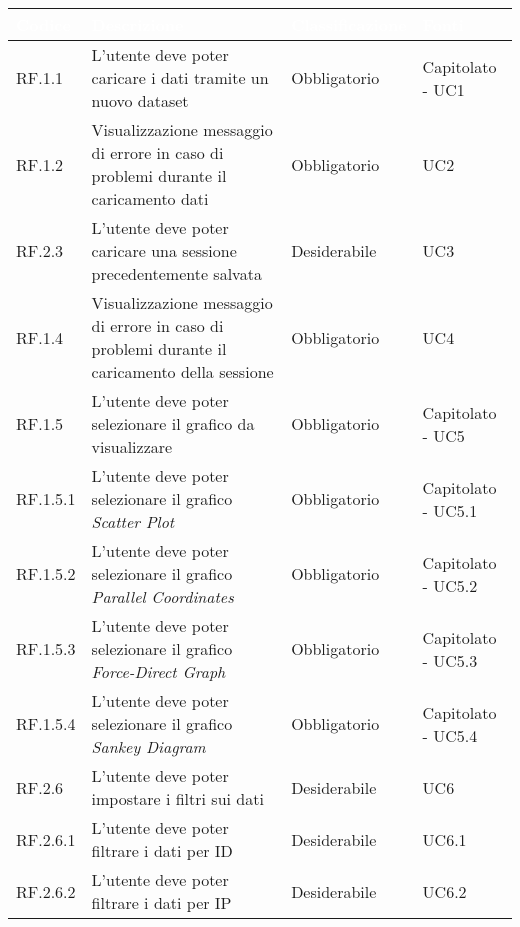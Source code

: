 \begin{center}
  \centering
  \begin{longtable}{|L{1,5cm}|C{5,5cm}|C{3cm}|C{2cm}|}
    \hline
    \textcolor[HTML]{FFFFFF}{\textbf{Codice}} & \textcolor[HTML]{FFFFFF}{\textbf{Descrizione}} & \textcolor[HTML]{FFFFFF}{\textbf{Classificazione}} & \textcolor[HTML]{FFFFFF}{\textbf{Fonti}}
    \\ \hline
    RF.1.1 & L'utente deve poter caricare i dati tramite un nuovo dataset & Obbligatorio & Capitolato - UC1 \\ \hline
    RF.1.2 & Visualizzazione messaggio di errore in caso di problemi durante il caricamento dati & Obbligatorio & UC2 \\ \hline
    RF.2.3 & L'utente deve poter caricare una sessione precedentemente salvata & Desiderabile & UC3 \\ \hline
    RF.1.4 & Visualizzazione messaggio di errore in caso di problemi durante il caricamento della sessione & Obbligatorio & UC4 \\ \hline
    RF.1.5 & L'utente deve poter selezionare il grafico da visualizzare & Obbligatorio & Capitolato - UC5 \\ \hline
    RF.1.5.1 & L'utente deve poter selezionare il grafico \textit{Scatter Plot} & Obbligatorio & Capitolato - UC5.1 \\ \hline
    RF.1.5.2 & L'utente deve poter selezionare il grafico \textit{Parallel Coordinates} & Obbligatorio & Capitolato - UC5.2 \\ \hline
    RF.1.5.3 & L'utente deve poter selezionare il grafico \textit{Force-Direct Graph} & Obbligatorio & Capitolato - UC5.3 \\ \hline
    RF.1.5.4 & L'utente deve poter selezionare il grafico \textit{Sankey Diagram} & Obbligatorio & Capitolato - UC5.4 \\ \hline
    RF.2.6 & L'utente deve poter impostare i filtri sui dati & Desiderabile & UC6 \\ \hline
    RF.2.6.1 & L'utente deve poter filtrare i dati per ID & Desiderabile & UC6.1 \\ \hline
    RF.2.6.2 & L'utente deve poter filtrare i dati per IP & Desiderabile & UC6.2 \\ \hline

\end{longtable}
\end{center}
